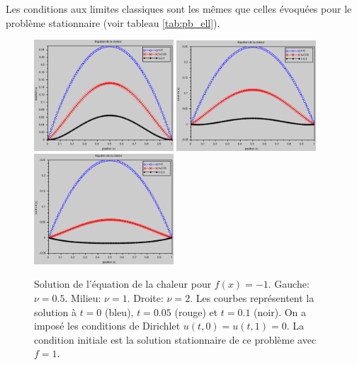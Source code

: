 \documentclass[12pt,a4paper,twoside]{article}
\begin{document}

Les conditions aux limites classiques sont les m\^emes que celles \'evoqu\'ees pour le probl\`eme
stationnaire (voir tableau \ref{tab:pb_ell}).


\begin{figure}[h]
  \centering
  \includegraphics[width = 5.2cm]{Figures/chaleur_nu0_5.eps}
  \includegraphics[width = 5.2cm]{Figures/chaleur_nu1.eps}
  \includegraphics[width = 5.2cm]{Figures/chaleur_nu2.eps}
  \caption{Solution de l'\'equation de la chaleur
  pour $f(x) = -1$. Gauche: $\nu = 0.5$.
  Milieu: $\nu = 1$. Droite: $\nu = 2$.
  Les courbes repr\'esentent la solution \`a $t=0$ (bleu), $t=0.05$ (rouge) et $t=0.1$ (noir).
  On a impos\'e les conditions de Dirichlet $u(t,0) = u(t,1) = 0$.
  La condition initiale est la solution stationnaire de ce probl\`eme avec $f=1$.}
  \label{fig:chaleur_nu}
\end{figure}
\end{document}
